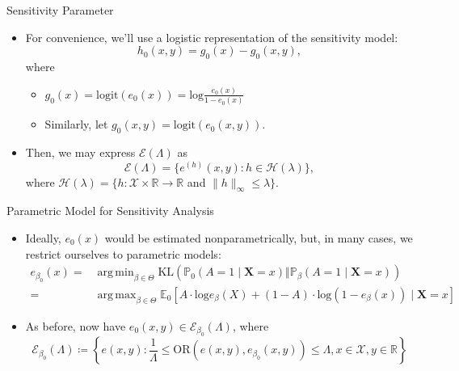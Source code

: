 \documentclass{beamer}
\newcommand{\R}{\mathbb{R}}
\newcommand{\E}{\mathbb{E}}
\newcommand{\pr}{\mathbb{P}}
\DeclareMathOperator*{\argmin}{arg\,min}
\DeclareMathOperator*{\argmax}{arg\,max}
\begin{document}
\begin{frame}{Sensitivity Parameter}

\begin{itemize}
  \itemsep12pt
  \item For convenience, we'll use a logistic representation of the sensitivity
    model:
    \[ h_0(x,y) = g_0(x) - g_0(x,y),\]
    where
    \begin{itemize}
      \itemsep6pt
      \item $g_0(x)=\text{logit}(e_0(x))=\text{log}\frac{e_0(x)}{1-e_0(x)}$
      \item Similarly, let $g_0(x,y) = \text{logit}(e_0(x,y))$.
    \end{itemize}
  \item Then, we may express $\mathcal{E}(\Lambda)$ as
    \[\mathcal{E}(\Lambda) = \{e^{(h)}(x,y): h \in \mathcal{H}(\lambda)\},\]
    where $\mathcal{H}(\lambda) = \{h: \mathcal{X} \times \R \to \R$ and
    $\lVert h \rVert_{\infty} \leq \lambda\}$.
\end{itemize}

\end{frame}


\begin{frame}{Parametric Model for Sensitivity Analysis}

\begin{itemize}
  \itemsep12pt
  \item Ideally, $e_0(x)$ would be estimated nonparametrically, but, in many
    cases, we restrict ourselves to parametric models:
    \[
    \begin{aligned}
      e_{\beta_0}(x) =& \argmin_{\beta \in \Theta} \text{KL}(\pr_0(A = 1 \mid
      \bm{X} = x) \Vert \pr_{\beta}(A = 1 \mid \bm{X} = x))\\
      =& \argmax_{\beta \in \Theta} \E_0[A \cdot \text{log}e_{\beta}(X) +
      (1 - A) \cdot \text{log}(1 - e_{\beta}(x)) \mid \bm{X} = x]
    \end{aligned}
    \]
  \item As before, now have $e_0(x,y) \in \mathcal{E}_{\beta_0}(\Lambda)$, where
    \[\mathcal{E}_{\beta_0}(\Lambda) \coloneqq \left\{e(x,y): \frac{1}{\Lambda}
      \leq \text{OR}(e(x,y), e_{\beta_0}(x,y)) \leq \Lambda, x \in \mathcal{X},
      y \in \R \right\} \]
\end{itemize}


\end{frame}
\end{document}
